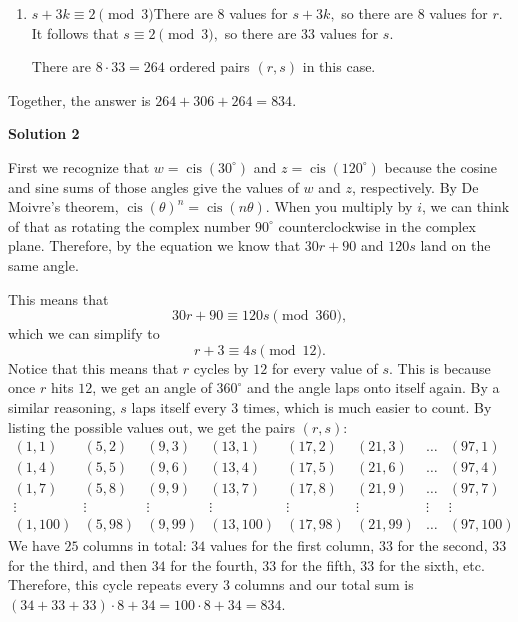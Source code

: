 \begin{enumerate}
\begin{enumerate}
 There are $9\cdot34=306$ ordered pairs $(r,s)$ in this case.  

 
        \item $s+3k\equiv2\pmod{3}$There are $8$ values for $s+3k,$ so there are $8$ values for $r.$ It follows that $s\equiv2\pmod{3},$ so there are $33$ values for $s.$ 

 There are $8\cdot33=264$ ordered pairs $(r,s)$ in this case.

 
            \end{enumerate}
            Together, the answer is $264+306+264=\boxed{834}.$




\textbf{Solution 2}

First we recognize that $w = \operatorname{cis}(30^{\circ})$ and $z = \operatorname{cis}(120^{\circ})$ because the cosine and sine sums of those angles give the values of $w$ and $z$, respectively. By De Moivre's theorem, $\operatorname{cis}(\theta)^n = \operatorname{cis}(n\theta)$. When you multiply by $i$, we can think of that as rotating the complex number $90^{\circ}$ counterclockwise in the complex plane. Therefore, by the equation we know that $30r + 90$ and $120s$ land on the same angle.

 This means that
 \[30r + 90 \equiv 120s \pmod{360},\]which we can simplify to 
 \[r+3 \equiv 4s \pmod{12}.\]Notice that this means that $r$ cycles by $12$ for every value of $s$. This is because once $r$ hits $12$, we get an angle of $360^{\circ}$ and the angle laps onto itself again. By a similar reasoning, $s$ laps itself every $3$ times, which is much easier to count. By listing the possible values out, we get the pairs $(r,s)$:
 \[\begin{array}{cccccccc} (1,1) & (5,2) & (9,3) & (13,1) & (17,2) & (21,3) & \ldots & (97,1) \\ (1,4) & (5,5) & (9,6) & (13,4) & (17,5) & (21,6) & \ldots & (97,4) \\  (1,7) & (5,8) & (9,9) & (13,7) & (17,8) & (21,9) & \ldots & (97,7) \\ [-1ex] \vdots & \vdots & \vdots & \vdots & \vdots & \vdots & \vdots & \vdots \\ (1,100) & (5,98) & (9,99) & (13,100) & (17,98) & (21,99) & \ldots & (97,100) \end{array}\]We have $25$ columns in total: $34$ values for the first column, $33$ for the second, $33$ for the third, and then $34$ for the fourth, $33$ for the fifth, $33$ for the sixth, etc. Therefore, this cycle repeats every $3$ columns and our total sum is $(34+33+33) \cdot 8 + 34 = 100 \cdot 8 + 34 = \boxed{834}$.


\end{enumerate}
